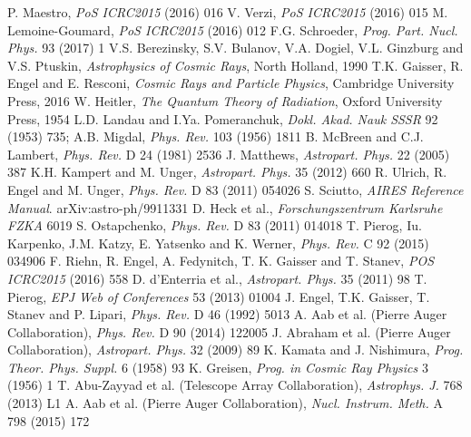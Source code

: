 \documentclass[twoside,12pt]{article}
\begin{document}
\begin{thebibliography}{99}
\itemsep -2pt 
  P. Maestro, {\it PoS ICRC2015} (2016) 016
 V. Verzi,  {\it PoS ICRC2015} (2016) 015
 M. Lemoine-Goumard,  {\it PoS ICRC2015} (2016) 012
F.G. Schroeder, {\em Prog. Part. Nucl. Phys.} 93 (2017) 1
 V.S. Berezinsky, S.V. Bulanov, V.A. Dogiel, V.L. Ginzburg and V.S. Ptuskin, {\it Astrophysics of Cosmic Rays}, North Holland, 1990 
 T.K. Gaisser, R. Engel and E. Resconi, {\it Cosmic Rays and Particle Physics}, Cambridge University Press, 2016
 W. Heitler, {\it The Quantum Theory of Radiation}, Oxford University Press, 1954
 L.D.  Landau and  I.Ya.  Pomeranchuk, {\it Dokl.  Akad.  Nauk
SSSR} 92 (1953) 735;  A.B. Migdal, {\it Phys. Rev.} 103 (1956) 1811
 B. McBreen and C.J. Lambert, {\it Phys. Rev. }D
24 (1981) 2536
 J. Matthews, {\it Astropart. Phys.} 22 (2005) 387
 K.H. Kampert and M. Unger, {\it  Astropart. Phys.} 35 (2012) 660
 R. Ulrich, R. Engel and M. Unger, {\it Phys. Rev.} D 83 (2011) 054026  %
 S. Sciutto, {\it  AIRES Reference Manual}. arXiv:astro-ph/9911331
 D. Heck et al., {\it Forschungszentrum Karlsruhe FZKA} 6019
 S. Ostapchenko, {\it Phys. Rev.} D 83  (2011) 014018 %
 T. Pierog, Iu. Karpenko, J.M. Katzy, E. Yatsenko
and K. Werner, {\it Phys. Rev.} C 92  (2015) 034906  %
 F. Riehn, R. Engel, A. Fedynitch, T. K. Gaisser
and T. Stanev, {\it POS ICRC2015} (2016) 558  %
 D. d’Enterria et al., {\it Astropart. Phys.} 35 (2011) 98
 T. Pierog, {\it EPJ Web of Conferences} 53  (2013) 01004
 J. Engel, T.K. Gaisser, T. Stanev and P. Lipari, {\it Phys. Rev.} D 46 (1992) 5013
A. Aab et al. (Pierre Auger Collaboration), {\it  Phys. Rev.} D 90 (2014) 122005 %
 J. Abraham et al. (Pierre Auger Collaboration), {\it  Astropart. Phys.} 32 (2009) 89
 K. Kamata and J. Nishimura, {\it Prog. Theor. Phys. Suppl.} 6 (1958) 93 
 K. Greisen, {\it Prog. in Cosmic Ray Physics} 3 (1956) 1
  T. Abu-Zayyad et al. (Telescope Array Collaboration), {\it Astrophys. J.} 768 (2013) L1
 	A. Aab et al. (Pierre Auger Collaboration), {\it Nucl. Instrum. Meth.} A 798 (2015) 172

\end{thebibliography}
\end{document}
